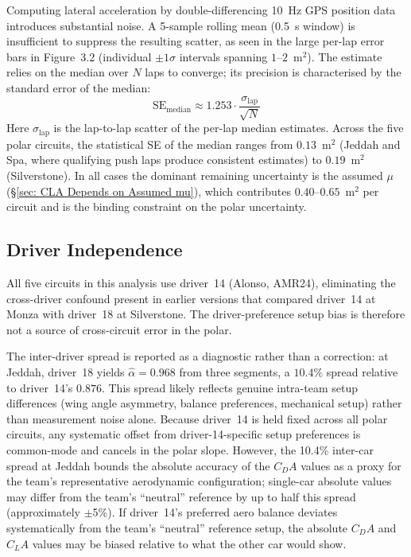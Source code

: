 Computing lateral acceleration by double-differencing 10~Hz GPS position data introduces substantial noise. A 5-sample rolling mean (0.5~s window) is insufficient to suppress the resulting scatter, as seen in the large per-lap error bars in Figure~3.2 (individual $\pm 1\sigma$ intervals spanning $1$--$2$~m$^2$). The estimate relies on the median over $N$ laps to converge; its precision is characterised by the standard error of the median:
\begin{equation}
    \text{SE}_\text{median} \approx 1.253 \cdot \frac{\sigma_\text{lap}}{\sqrt{N}}
\end{equation}
Here $\sigma_\text{lap}$ is the lap-to-lap scatter of the per-lap median estimates. Across the five polar circuits, the statistical SE of the median ranges from $0.13$~m$^2$ (Jeddah and Spa, where qualifying push laps produce consistent estimates) to $0.19$~m$^2$ (Silverstone). In all cases the dominant remaining uncertainty is the assumed $\mu$ (\S\ref{sec: CLA Depends on Assumed mu}), which contributes $0.40$--$0.65$~m$^2$ per circuit and is the binding constraint on the polar uncertainty.

\subsection{Driver Independence}

All five circuits in this analysis use driver~14 (Alonso, AMR24), eliminating the cross-driver confound present in earlier versions that compared driver~14 at Monza with driver~18 at Silverstone. The driver-preference setup bias is therefore not a source of cross-circuit error in the polar.

The inter-driver spread is reported as a diagnostic rather than a correction: at Jeddah, driver~18 yields $\hat\alpha = 0.968$ from three segments, a $10.4\%$ spread relative to driver~14's $0.876$. This spread likely reflects genuine intra-team setup differences (wing angle asymmetry, balance preferences, mechanical setup) rather than measurement noise alone. Because driver~14 is held fixed across all polar circuits, any systematic offset from driver-14-specific setup preferences is common-mode and cancels in the polar slope. However, the 10.4\% inter-car spread at Jeddah bounds the absolute accuracy of the $C_DA$ values as a proxy for the team's representative aerodynamic configuration; single-car absolute values may differ from the team's ``neutral'' reference by up to half this spread (approximately $\pm$5\%). If driver~14's preferred aero balance deviates systematically from the team's ``neutral'' reference setup, the absolute $C_DA$ and $C_LA$ values may be biased relative to what the other car would show.